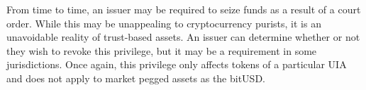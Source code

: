 From time to time, an issuer may be required to seize funds as a result of a
court order. While this may be unappealing to cryptocurrency purists, it is an
unavoidable reality of trust-based assets. An issuer can determine whether or
not they wish to revoke this privilege, but it may be a requirement in some
jurisdictions. Once again, this privilege only affects tokens of a particular
UIA and does not apply to market pegged assets as the bitUSD.
